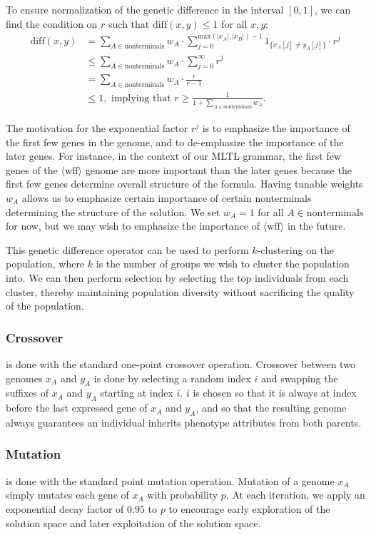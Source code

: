 \documentclass[runningheads]{llncs}
\begin{document}
To ensure normalization of the genetic difference in the interval $[0, 1]$, we can find the condition on $r$ such that $\text{diff}(x, y) \leq 1$ for all $x, y$:
\begin{align*}
    \text{diff}(x, y) &= \sum_{A \in \text{nonterminals}} w_A \cdot \sum_{j = 0}^{\text{max}(|x_A|, |x_B|)-1}
    1_{\{x_A[j] \neq y_A[j]\}} \cdot r^j\\
    &\leq \sum_{A \in \text{nonterminals}}
    w_A \cdot \sum_{j = 0}^{\infty} r^j\\
    &= \sum_{A \in \text{nonterminals}} w_A \cdot \frac{r}{r-1} \\
    &\leq 1, \text{ implying that } r \geq \frac{1}{1 + \sum_{A \in \text{nonterminals}} w_A}.
\end{align*}

The motivation for the exponential factor $r^j$ is to emphasize the importance of the first few genes in the genome, and to de-emphasize the importance of the later genes. 
For instance, in the context of our MLTL grammar, the first few genes of the $\langle \text{wff} \rangle$ genome are more important than the later genes because the first few genes determine overall structure of the formula. 
Having tunable weights $w_A$ allows us to emphasize certain importance of certain nonterminals determining the structure of the solution. 
We set $w_A = 1$ for all $A \in \text{nonterminals}$ for now, but we may wish to emphasize the importance of $\langle \text{wff} \rangle$ in the future.

This genetic difference operator can be used to perform $k$-clustering on the population, where $k$ is the number of groups we wish to cluster the population into.
We can then perform selection by selecting the top individuals from each cluster, thereby maintaining population diversity without sacrificing the quality of the population.

\subsubsection{Crossover} is done with the standard one-point crossover operation. 
Crossover between two genomes $x_A$ and $y_A$ is done by selecting a random index $i$ and swapping the suffixes of $x_A$ and $y_A$ starting at index $i$.
$i$ is chosen so that it is always at index before the last expressed gene of $x_A$ and $y_A$, and so that the resulting genome always guarantees an individual inherits phenotype attributes from both parents. 

\subsubsection{Mutation} is done with the standard point mutation operation. 
Mutation of a genome $x_A$ simply mutates each gene of $x_A$ with probability $p$. 
At each iteration, we apply an exponential decay factor of $0.95$ to $p$ to encourage early exploration of the solution space and later exploitation of the solution space.
\end{document}

